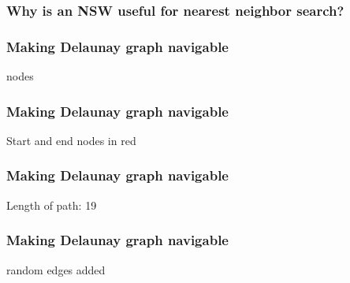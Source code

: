 \documentclass{beamer}
\begin{document}
  \begin{frame}
    \frametitle{Why is an NSW useful for nearest neighbor search?}  
    \Large
    \begin{itemize}
    \end{itemize}
  \end{frame}
  
  \begin{frame}
    \frametitle{Making Delaunay graph navigable}  
          \begin{figure}[delaunay_triangulation_256_points]
  
  \end{figure}
  \vspace{-0.5cm}
     nodes
  \end{frame}  

  \begin{frame}
    \frametitle{Making Delaunay graph navigable}  
          \begin{figure}[delaunay_triangulation_start_end_points]
  
  \end{figure}
  \vspace{-0.5cm}
    \centering Start and end nodes in red
  \end{frame}  

  \begin{frame}
    \frametitle{Making Delaunay graph navigable}  
          \begin{figure}[delaunay_triangulation_longest_path]
  
  \end{figure}
  \vspace{-0.5cm}
    \centering Length of path: 19
  \end{frame}  

  \begin{frame}
    \frametitle{Making Delaunay graph navigable}  
          \begin{figure}[delaunay_triangulation_random_edges]
  
  \end{figure}
  \vspace{-0.5cm}
     random edges added
  \end{frame}  
\end{document}
